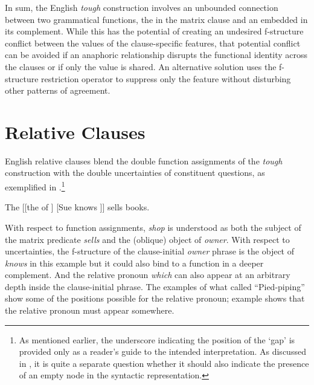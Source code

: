 \documentclass[output=paper,hidelinks]{langscibook}
\begin{document}
In sum,  the English \textit{tough} construction involves an unbounded connection between two grammatical functions, the \SUBJ in the matrix clause and an \OBJ embedded in its complement. While this has the potential of  creating an undesired f-structure conflict between the values of the clause-specific \CASE features, that potential conflict can be avoided if an anaphoric relationship disrupts the functional identity across the clauses or if only the \PRED value is shared.  An alternative solution uses the f-structure restriction operator to suppress only the \CASE feature without disturbing other patterns of agreement.



\section{Relative Clauses}\label{relativeclauses}


English relative clauses blend the double function assignments of the \textit{tough} construction with the double uncertainties of constituent questions, as exemplified in .\footnote{As mentioned earlier, the underscore indicating the position of the `gap' is provided only as a reader's guide to the intended interpretation.  As discussed in , it is quite a separate question whether it should also indicate the presence of an empty node in the syntactic representation.}

\ea \label{rel0b} \hsp{-.3em}
                        The  [[the  of ] [Sue knows   ]] sells books.
\z

\noindent With respect to function assignments, \textit{shop} is understood as both the subject of the matrix predicate \textit{sells} and the (oblique) object of \textit{owner}.  With respect to uncertainties, the f-structure of the clause-initial \textit{owner} phrase is the object of \textit{knows} in this example but it could also bind to a function in a deeper complement.  And the relative pronoun \textit{which} can also appear at an arbitrary depth inside the clause-initial phrase. The examples  of what \citet{ross1967constraints} called ``Pied-piping''  show  some of the positions possible for the relative pronoun; example  shows that the relative pronoun must appear somewhere.   
\end{document}
